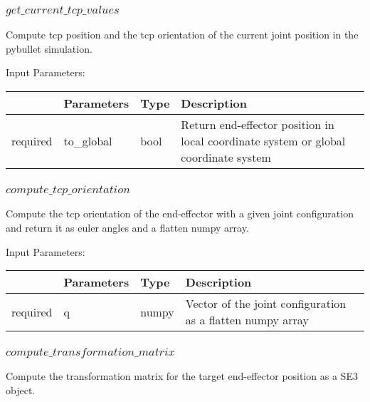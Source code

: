 \documentclass[
	ngerman,
	accentcolor=9c,%
	type=intern,
	marginpar=false
	]{tudapub}
\begin{document}
\subsubsection{$get\_current\_tcp\_values$}
\noindent Compute tcp position and the tcp orientation of the current joint position in the pybullet simulation.

\vspace{0.5cm}
\noindent Input Parameters:
\vspace{0.5cm}

\begin{tabular}{|p{}|p{}|p{}| p{}|}
\hline
 & \textbf{Parameters} & \textbf{Type} & \textbf{Description} \\
\hline
required & to\_global & bool & Return end-effector position in local coordinate system or global coordinate system \\
\hline
\end{tabular}
\vspace{1cm}

\subsubsection{$compute\_tcp\_orientation$}
\noindent Compute the tcp orientation of the end-effector with a given joint configuration and return it as euler angles and a flatten numpy array.

\vspace{0.5cm}
\noindent Input Parameters:
\vspace{0.5cm}

\begin{tabular}{|p{}|p{}|p{}| p{}|}
\hline
 & \textbf{Parameters} & \textbf{Type} & \textbf{Description} \\
\hline
required & q & numpy & Vector of the joint configuration as a flatten numpy array \\
\hline
\end{tabular}
\vspace{1cm}

\subsubsection{$compute\_transformation\_matrix$}
\vspace{0.5cm}
\noindent Compute the transformation matrix for the target end-effector position as a SE3 object. 
\end{document}
